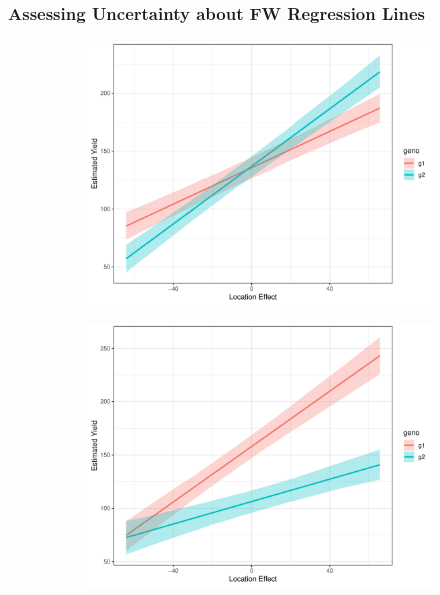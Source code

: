 \documentclass{beamer}
\begin{document}
\begin{frame}
	\frametitle{Assessing Uncertainty about FW Regression Lines}

\begin{figure}[H]
  \begin{subfigure}{0.3\textwidth}
    \centering
    \includegraphics[width=.9\linewidth]{fwpair_1.pdf}
    \caption{}
  \end{subfigure}%
  \begin{subfigure}{0.3\textwidth}
    \centering
    \includegraphics[width=.9\linewidth]{fwpair_2.pdf}
    \caption{}
  \end{subfigure}
  \begin{subfigure}{0.3\textwidth}\quad
    \centering

\end{subfigure}
\end{figure}
\end{frame}
\end{document}
